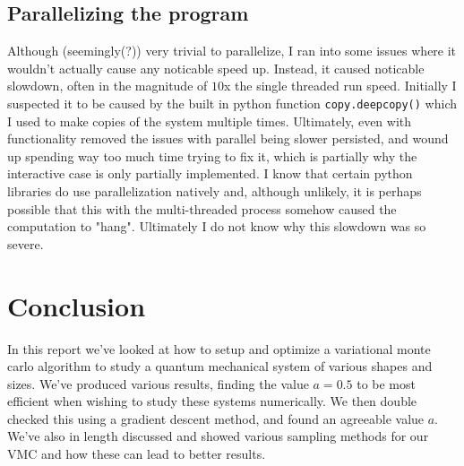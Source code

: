 \documentclass{article}
\begin{document}
\subsection{Parallelizing the program}
Although (seemingly(?)) very trivial to parallelize, I ran into some issues where it wouldn't actually cause any noticable speed up. Instead, it caused noticable slowdown, often in the magnitude of $10$x the single threaded run speed. Initially I suspected it to be caused by the built in python function \texttt{copy.deepcopy()} which I used to make copies of the system multiple times. Ultimately, even with functionality removed the issues with parallel being slower persisted, and wound up spending way too much time trying to fix it, which is partially why the interactive case is only partially implemented. I know that certain python libraries do use parallelization natively and, although unlikely, it is perhaps possible that this with the multi-threaded process somehow caused the computation to "hang". Ultimately I do not know why this slowdown was so severe.
\section{Conclusion}
In this report we've looked at how to setup and optimize a variational monte carlo algorithm to study a quantum mechanical system of various shapes and sizes. We've produced various results, finding the value $a=0.5$ to be most efficient when wishing to study these systems numerically. We then double checked this using a gradient descent method, and found an agreeable value $a$. We've also in length discussed and showed various sampling methods for our VMC and how these can lead to better results.


\newpage
\renewcommand*\appendixpagename{\Large Appendices}
\appendixpage
\addappheadtotoc
\renewcommand{\thesubsection}{\Alph{subsection}}
\end{document}
